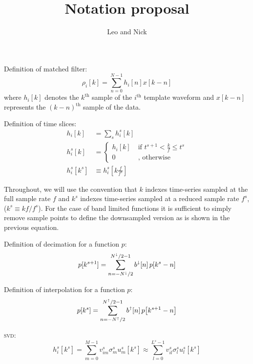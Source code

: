 \documentclass[letterpaper,11pt]{article}
\title{Notation proposal}
\author{Leo and Nick}
\begin{document}
\maketitle

Definition of matched filter:
\begin{equation}
\rho_i [k] = \sum_{n=0}^{N-1} h_{i}[n] x [k-n]
\end{equation}
where $h_i[k]$ denotes the $k^{\mathrm{th}}$ sample of the $i^{\mathrm{th}}$
template waveform and $x[k-n]$ represents the $(k-n)^{\mathrm{th}}$ sample of
the data.

Definition of time slices:
\begin{align}
h_{i}[k] &= \sum_s h_{i}^{s}[k] \\
h_{i}^{s}[k] &= \left\{ \begin{aligned}
    h_{i}[k] & \; \text{if } t^{s+1} < \frac{k}{f} \leq t^{s} \\
    0 & \; \text{, otherwise }
    \end{aligned} \right. \\
h_{i}^{s}[k^{s}] &\equiv h_{i}^{s}\!\left[k\frac{f}{f^{s}}\right]
\end{align}

Throughout, we will use the convention that $k$ indexes time-series sampled at
the full sample rate $f$ and $k^s$ indexes time-series sampled at a reduced
sample rate $f^s$, ($k^{s} \equiv k f / f^{s}$).  For the case of band limited
functions it is sufficient to simply remove sample points to define the
downsampled version as is shown in the previous equation.  

Definition of decimation for a function $p$:
\begin{equation}
p[k^{s+1}] = \sum_{n=-N^\shortdownarrow/2}^{N^\shortdownarrow/2-1} b^\shortdownarrow[n] \, p\!\left[k^{s}-n\right]
\end{equation}

Definition of interpolation for a function $p$:
\begin{equation}
p[k^{s}] = \sum_{n=-N^\shortuparrow/2}^{N^\shortuparrow/2-1} b^\shortuparrow[n] \, p\!\left[k^{s+1}-n\right]
\end{equation}

\textsc{svd}:
\begin{equation}
h^{s}_{i}\!\left[k^{s}\right] = \sum_{m=0}^{M-1} v^{s}_{im} \sigma^{s}_m u^{s}_{m}[k^{s}] \approx \sum_{l=0}^{L^s-1} v^{s}_{il} \sigma^{s}_l u^{s}_{l}[k^{s}]
\end{equation}
\end{document}

